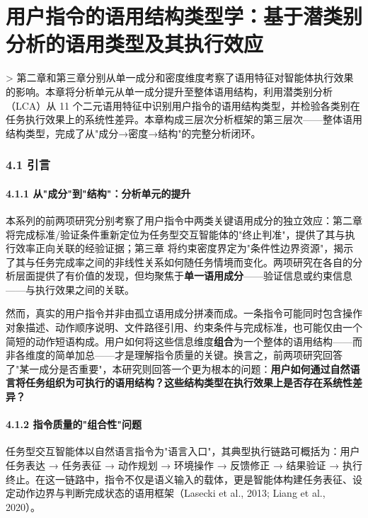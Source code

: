\documentclass[12pt,a4paper,openany,oneside]{ctexrep}
\begin{document}
\newpage

\newpage

\chapter{用户指令的语用结构类型学：基于潜类别分析的语用类型及其执行效应}


> 第二章和第三章分别从单一成分和密度维度考察了语用特征对智能体执行效果的影响。本章将分析单元从单一成分提升至整体语用结构，利用潜类别分析（LCA）从 11 个二元语用特征中识别用户指令的语用结构类型，并检验各类别在任务执行效果上的系统性差异。本章构成三层次分析框架的第三层次——整体语用结构类型，完成了从"成分→密度→结构"的完整分析闭环。


\subsection{4.1 引言}


\subsubsection{4.1.1 从"成分"到"结构"：分析单元的提升}


本系列的前两项研究分别考察了用户指令中两类关键语用成分的独立效应：第二章 将完成标准/验证条件重新定位为任务型交互智能体的"终止判准"，提供了其与执行效率正向关联的经验证据；第三章 将约束密度界定为"条件性边界资源"，揭示了其与任务完成率之间的非线性关系如何随任务情境而变化。两项研究在各自的分析层面提供了有价值的发现，但均聚焦于\textbf{单一语用成分}——验证信息或约束信息——与执行效果之间的关联。

然而，真实的用户指令并非由孤立语用成分拼凑而成。一条指令可能同时包含操作对象描述、动作顺序说明、文件路径引用、约束条件与完成标准，也可能仅由一个简短的动作短语构成。用户如何将这些信息维度\textbf{组合}为一个整体的语用结构——而非各维度的简单加总——才是理解指令质量的关键。换言之，前两项研究回答了"某一成分是否重要"，本研究则回答一个更为根本的问题：\textbf{用户如何通过自然语言将任务组织为可执行的语用结构？这些结构类型在执行效果上是否存在系统性差异？}

\subsubsection{4.1.2 指令质量的"组合性"问题}


任务型交互智能体以自然语言指令为"语言入口"，其典型执行链路可概括为：用户任务表达 → 任务表征 → 动作规划 → 环境操作 → 反馈修正 → 结果验证 → 执行终止。在这一链路中，指令不仅是语义输入的载体，更是智能体构建任务表征、设定动作边界与判断完成状态的语用框架（Lasecki et al., 2013; Liang et al., 2020）。
\end{document}
